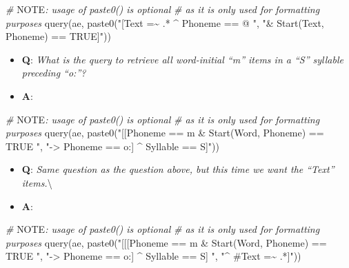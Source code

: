 \documentclass[
]{book}
\newenvironment{Shaded}{\begin{snugshade}}{\end{snugshade}}
\newcommand{\AlertTok}[1]{\textcolor[rgb]{0.94,0.16,0.16}{#1}}
\newcommand{\CommentTok}[1]{\textcolor[rgb]{0.56,0.35,0.01}{\textit{#1}}}
\newcommand{\FunctionTok}[1]{\textcolor[rgb]{0.00,0.00,0.00}{#1}}
\newcommand{\NormalTok}[1]{#1}
\newcommand{\StringTok}[1]{\textcolor[rgb]{0.31,0.60,0.02}{#1}}
\providecommand{\tightlist}{%
  \setlength{\itemsep}{0pt}\setlength{\parskip}{0pt}}
\begin{document}
\begin{Shaded}
\begin{Highlighting}[]
\CommentTok{\# }\AlertTok{NOTE}\CommentTok{: usage of paste0() is optional}
\CommentTok{\# as it is only used for formatting purposes}
\FunctionTok{query}\NormalTok{(ae, }\FunctionTok{paste0}\NormalTok{(}\StringTok{"[Text =\textasciitilde{} .* \^{} Phoneme == @ "}\NormalTok{,}
                 \StringTok{"\& Start(Text, Phoneme) == TRUE]"}\NormalTok{))}
\end{Highlighting}
\end{Shaded}

\begin{itemize}
\tightlist
\item
  \textbf{Q}: \emph{What is the query to retrieve all word-initial ``m'' items in a ``S'' syllable preceding ``o:''?}
\item
  \textbf{A}:
\end{itemize}

\begin{Shaded}
\begin{Highlighting}[]
\CommentTok{\# }\AlertTok{NOTE}\CommentTok{: usage of paste0() is optional}
\CommentTok{\# as it is only used for formatting purposes}
\FunctionTok{query}\NormalTok{(ae, }\FunctionTok{paste0}\NormalTok{(}\StringTok{"[[Phoneme == m \& Start(Word, Phoneme) == TRUE "}\NormalTok{,}
                 \StringTok{"{-}\textgreater{} Phoneme == o:] \^{} Syllable == S]"}\NormalTok{))}
\end{Highlighting}
\end{Shaded}

\begin{itemize}
\tightlist
\item
  \textbf{Q}: \emph{Same question as the question above, but this time we want the ``Text'' items.}\textbackslash{}
\item
  \textbf{A}:
\end{itemize}

\begin{Shaded}
\begin{Highlighting}[]
\CommentTok{\# }\AlertTok{NOTE}\CommentTok{: usage of paste0() is optional}
\CommentTok{\# as it is only used for formatting purposes}
\FunctionTok{query}\NormalTok{(ae, }\FunctionTok{paste0}\NormalTok{(}\StringTok{"[[[Phoneme == m \& Start(Word, Phoneme) == TRUE "}\NormalTok{,}
                 \StringTok{"{-}\textgreater{} Phoneme == o:] \^{} Syllable == S] "}\NormalTok{,}
                 \StringTok{"\^{} \#Text =\textasciitilde{} .*]"}\NormalTok{))}
\end{Highlighting}
\end{Shaded}
\end{document}
